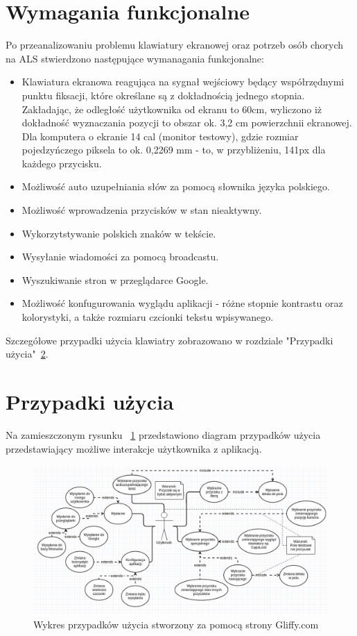 \documentclass[twoside,a4paper]{book}
\begin{document}
\section{Wymagania funkcjonalne}
Po przeanalizowaniu problemu klawiatury ekranowej oraz potrzeb osób chorych na ALS stwierdzono następujące wymanagania funkcjonalne:
\begin{itemize}
\item Klawiatura ekranowa reagująca na sygnał wejściowy będący współrzędnymi punktu fiksacji, które określane są z dokładnością jednego stopnia. Zakładając, że odległość użytkownika od ekranu to 60cm, wyliczono iż dokładność wyznaczania pozycji to obszar ok. 3,2 cm powierzchnii ekranowej. Dla komputera o ekranie 14 cal (monitor testowy), gdzie rozmiar pojedzyńczego piksela to ok. 0,2269 mm - to, w przybliżeniu, 141px dla każdego przycisku. 
\item Możliwość auto uzupełniania słów za pomocą słownika języka polskiego.
\item Możliwość wprowadzenia przycisków w stan nieaktywny. 
\item Wykorzytstywanie polskich znaków w tekście. 
\item Wysyłanie wiadomości za pomocą broadcastu. 
\item Wyszukiwanie stron w przeglądarce Google.
\item Możliwość konfugurowania wyglądu aplikacji - różne stopnie kontrastu oraz kolorystyki, a także rozmiaru czcionki tekstu wpisywanego. 
\end{itemize}
Szczegółowe przypadki użycia klawiatry zobrazowano w rozdziale "Przypadki użycia"~\ref{sec:uml}.

\section{Przypadki użycia}
  \label{sec:uml}
  Na zamieszczonym rysunku ~\ref{fig:useCase} przedstawiono diagram przypadków użycia przedstawiający możliwe interakcje użytkownika z aplikacją. 
\begin{figure}[!h]
		\centering
		\includegraphics[scale=0.4]{img/useCase.jpg}
		\caption{Wykres przypadków użycia stworzony za pomocą strony Gliffy.com}
		\label{fig:useCase}
\end{figure}
\end{document}
